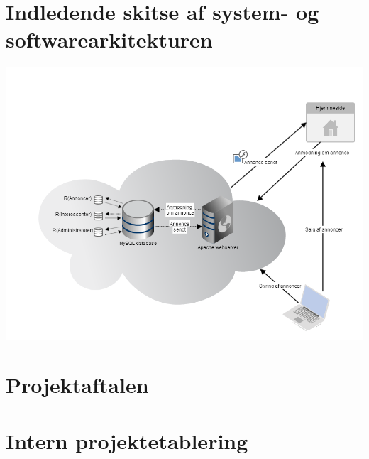 \documentclass[a4paper,12pt]{article}
\begin{document}
\section{Indledende skitse af system- og softwarearkitekturen}

\includegraphics[width=\textwidth,height=\textheight,keepaspectratio]{architecture_diagram.png}

\section{Projektaftalen}

\section{Intern projektetablering}
\end{document}
